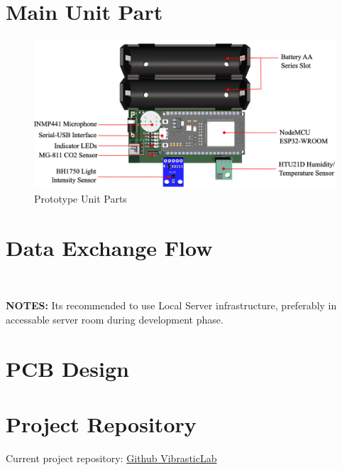 \documentclass[a4paper,12pt,oneside,pdflatex,italian,final,twocolumn]{article}
\begin{document}
	\raggedright
	\section{Main Unit Part}

	\centering
	\begin{figure}[!ht]
		\centering
		\includegraphics[width=\textwidth,]{images/node_part.png}
		\caption{Prototype Unit Parts}
	\end{figure}

	\raggedright
	\section{Data Exchange Flow}

	\\

	\vspace{10pt}

	\textbf{NOTES:} Its recommended to use Local Server infrastructure, preferably in accessable server room during development phase.

	\raggedright
	\section{PCB Design}

	\newpage
	

	\newpage
	

	\raggedright
	\section{Project Repository}

	Current project repository: \href{https://github.com/VibrasticLab/smarthome_proto}{Github VibrasticLab}
\end{document}
